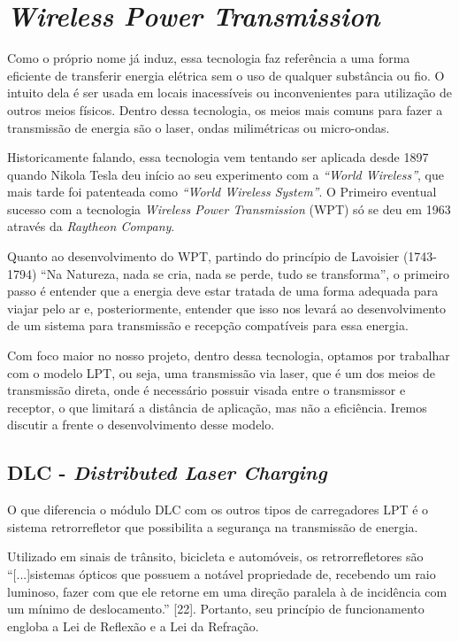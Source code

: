 \section{\emph{Wireless Power Transmission}}

Como o próprio nome já induz, essa tecnologia faz referência a uma forma eficiente de transferir energia elétrica sem o uso de qualquer substância ou fio. O intuito dela é ser usada em locais inacessíveis ou inconvenientes para utilização de outros meios físicos. Dentro dessa tecnologia, os meios mais comuns para fazer a transmissão de energia são o laser, ondas milimétricas ou micro-ondas.

Historicamente falando, essa tecnologia vem tentando ser aplicada desde 1897 quando Nikola Tesla deu início ao seu experimento com a \emph{``World Wireless''}, que mais tarde foi patenteada como \emph{``World Wireless System''}. O Primeiro eventual sucesso com a tecnologia \emph{Wireless Power Transmission} (WPT) só se deu em 1963 através da \emph{Raytheon Company}.

Quanto ao desenvolvimento do WPT, partindo do princípio de Lavoisier (1743-1794) “Na Natureza, nada se cria, nada se perde, tudo se transforma”, o primeiro passo é entender que a energia deve estar tratada de uma forma adequada para viajar pelo ar e, posteriormente, entender que isso nos levará ao desenvolvimento de um sistema para transmissão e recepção compatíveis para essa energia.

Com foco maior no nosso projeto, dentro dessa tecnologia, optamos por trabalhar com o modelo LPT, ou seja, uma transmissão via laser, que é um dos meios de transmissão direta, onde é necessário possuir visada entre o transmissor e receptor, o que limitará a distância de aplicação, mas não a eficiência. Iremos discutir a frente o desenvolvimento desse modelo.

\subsection{DLC - \emph{Distributed Laser Charging}}

O que diferencia o módulo DLC com os outros tipos de carregadores LPT é o sistema retrorrefletor que possibilita a segurança na transmissão de energia.

Utilizado em sinais de trânsito, bicicleta e automóveis, os retrorrefletores são “[...]sistemas ópticos que possuem a notável propriedade de, recebendo um raio luminoso, fazer com que ele retorne em uma direção paralela à de incidência com um mínimo de deslocamento.” [22]. Portanto, seu princípio de funcionamento engloba a Lei de Reflexão e a Lei da Refração.

